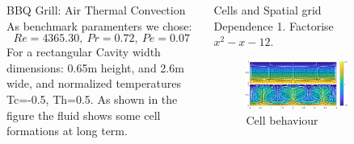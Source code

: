 \documentclass[final]{beamer}
\newlength{\sepwid}
\newlength{\onecolwid}
\newlength{\twocolwid}
\begin{document}
\begin{frame}[t]
\begin{columns}[t]
\begin{column}{\onecolwid}
\end{column} %

\begin{column}{\sepwid}\end{column} %

\begin{column}{\twocolwid} %

\begin{columns}[t,totalwidth=\twocolwid] %

\begin{column}{\onecolwid}\vspace{-.6in} %


\begin{block}{BBQ Grill: Air Thermal Convection}
As benchmark paramenters we chose:
$$Re=4365.30, \: Pr=0.72, \: Pe=0.07$$
For a rectangular Cavity width dimensions: 0.65m height, and 2.6m wide, and normalized temperatures Tc=-0.5, Th=0.5. As shown in the figure the fluid shows some cell formations at long term.
\end{block}


\end{column} %

\begin{column}{\onecolwid}\vspace{-.6in} %


\begin{block}{Cells and Spatial grid Dependence}
1. Factorise $x^2-x-12$.
\begin{figure}
\includegraphics[width=1.0\linewidth]{images/cells.pdf}
\caption{Cell behaviour}
\end{figure}
\end{block}


\end{column}
\end{columns}
\end{column}
\end{columns}
\end{frame}
\end{document}
